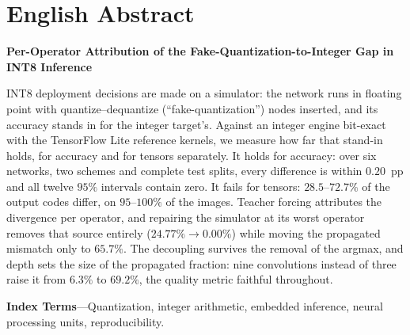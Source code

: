 \documentclass[journal]{IEEEtran}
\begin{document}
\section*{English Abstract}
\noindent\textbf{Per-Operator Attribution of the Fake-Quantization-to-Integer Gap in INT8 Inference}

\smallskip
\noindent INT8 deployment decisions are made on a simulator: the network runs in floating point with
quantize--dequantize (``fake-quantization'') nodes inserted, and its accuracy stands in for the integer target's.
Against an integer engine bit-exact with the TensorFlow Lite reference kernels, we measure how far that stand-in
holds, for accuracy and for tensors separately. It holds for accuracy: over six networks, two schemes and
complete test splits, every difference is within $0.20$~pp and all twelve $95\%$ intervals contain zero. It fails
for tensors: $28.5$--$72.7\%$ of the output codes differ, on $95$--$100\%$ of the images. Teacher forcing
attributes the divergence per operator, and repairing the simulator at its worst operator removes that source
entirely ($24.77\% \rightarrow 0.00\%$) while moving the propagated mismatch only to $65.7\%$. The decoupling
survives the removal of the argmax, and depth sets the size of the propagated fraction: nine convolutions instead
of three raise it from $6.3\%$ to $69.2\%$, the quality metric faithful throughout.

\smallskip
\noindent\textbf{Index Terms}---Quantization, integer arithmetic, embedded inference, neural processing
units, reproducibility.
\end{document}
